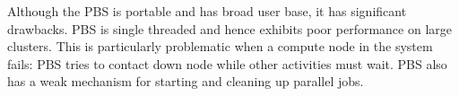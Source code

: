 Although the PBS is portable and has broad user base, it has significant drawbacks.
PBS is single threaded and hence exhibits poor performance on large clusters. 
This is particularly problematic when a compute node in the system fails: 
PBS tries to contact down node while other activities must wait. 
PBS also has a weak mechanism for starting and cleaning up parallel jobs. 
